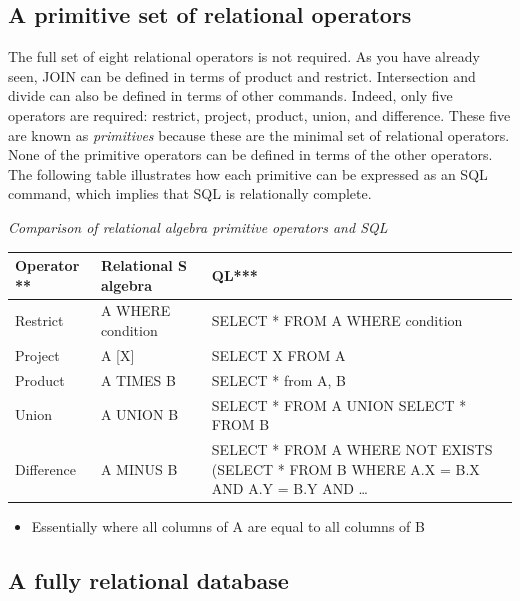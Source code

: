 \documentclass[
]{article}
\providecommand{\tightlist}{%
  \setlength{\itemsep}{0pt}\setlength{\parskip}{0pt}}
\begin{document}
\hypertarget{a-primitive-set-of-relational-operators}{%
\subsection*{A primitive set of relational operators}\label{a-primitive-set-of-relational-operators}}

The full set of eight relational operators is not required. As you have
already seen, JOIN can be defined in terms of product and restrict.
Intersection and divide can also be defined in terms of other commands.
Indeed, only five operators are required: restrict, project, product,
union, and difference. These five are known as \emph{primitives} because
these are the minimal set of relational operators. None of the primitive
operators can be defined in terms of the other operators. The following
table illustrates how each primitive can be expressed as an SQL command,
which implies that SQL is relationally complete.

\emph{Comparison of relational algebra primitive operators and SQL}

\begin{longtable}[]{@{}
  >{\raggedright\arraybackslash}p{}
  >{\raggedright\arraybackslash}p{}
  >{\raggedright\arraybackslash}p{}@{}}
\toprule
\textbf{Operator} \textbar{} ** & Relational \textbar{} \textbf{S
algebra} \textbar{} & QL*** \\
\midrule
\endhead
Restrict & A WHERE condition & SELECT * FROM A
WHERE condition \\
Project & A {[}X{]} & SELECT X FROM A \\
Product & A TIMES B & SELECT * from A, B \\
Union & A UNION B & SELECT * FROM A
UNION SELECT *
FROM B \\
Difference & A MINUS B & SELECT * FROM A
WHERE NOT EXISTS
(SELECT * FROM B
WHERE
A.X = B.X AND A.Y =
B.Y AND \ldots* \\
\bottomrule
\end{longtable}

\begin{itemize}
\tightlist
\item
  Essentially where all columns of A are equal to all columns of B
\end{itemize}

\hypertarget{a-fully-relational-database}{%
\subsection*{A fully relational database}\label{a-fully-relational-database}}
\end{document}
